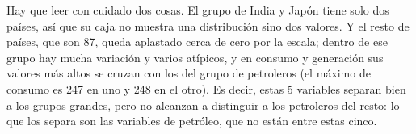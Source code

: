 \documentclass[
]{article}
\begin{document}
Hay que leer con cuidado dos cosas. El grupo de India y Japón tiene solo
dos países, así que su caja no muestra una distribución sino dos
valores. Y el resto de países, que son 87, queda aplastado cerca de cero
por la escala; dentro de ese grupo hay mucha variación y varios
atípicos, y en consumo y generación sus valores más altos se cruzan con
los del grupo de petroleros (el máximo de consumo es 247 en uno y 248 en
el otro). Es decir, estas 5 variables separan bien a los grupos grandes,
pero no alcanzan a distinguir a los petroleros del resto: lo que los
separa son las variables de petróleo, que no están entre estas cinco.
\end{document}
